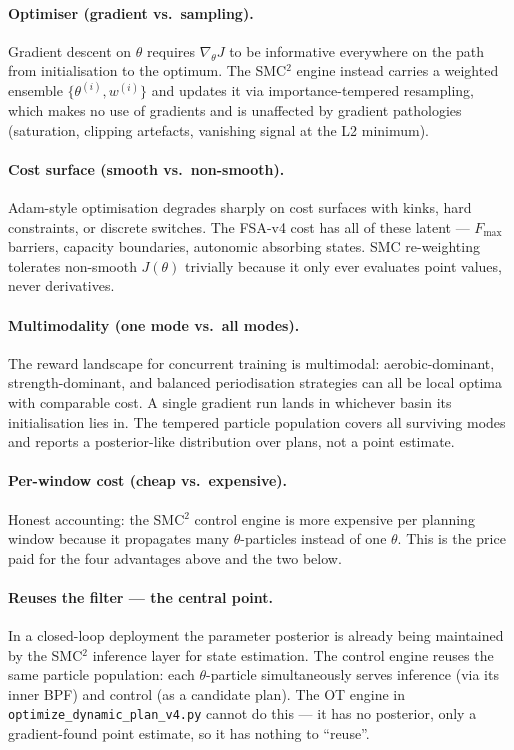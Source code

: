 \paragraph{Optimiser (gradient vs.\ sampling).} Gradient descent on $\theta$ requires $\nabla_\theta J$ to be informative everywhere on the path from initialisation to the optimum. The SMC$^2$ engine instead carries a weighted ensemble $\{\theta^{(i)}, w^{(i)}\}$ and updates it via importance-tempered resampling, which makes no use of gradients and is unaffected by gradient pathologies (saturation, clipping artefacts, vanishing signal at the L2 minimum).

\paragraph{Cost surface (smooth vs.\ non-smooth).} Adam-style optimisation degrades sharply on cost surfaces with kinks, hard constraints, or discrete switches. The FSA-v4 cost has all of these latent --- $F_{\max}$ barriers, capacity boundaries, autonomic absorbing states. SMC re-weighting tolerates non-smooth $J(\theta)$ trivially because it only ever evaluates point values, never derivatives.

\paragraph{Multimodality (one mode vs.\ all modes).} The reward landscape for concurrent training is multimodal: aerobic-dominant, strength-dominant, and balanced periodisation strategies can all be local optima with comparable cost. A single gradient run lands in whichever basin its initialisation lies in. The tempered particle population covers all surviving modes and reports a posterior-like distribution over plans, not a point estimate.

\paragraph{Per-window cost (cheap vs.\ expensive).} Honest accounting: the SMC$^2$ control engine is more expensive per planning window because it propagates many $\theta$-particles instead of one $\theta$. This is the price paid for the four advantages above and the two below.

\paragraph{Reuses the filter --- the central point.} In a closed-loop deployment the parameter posterior is already being maintained by the SMC$^2$ inference layer for state estimation. The control engine reuses the same particle population: each $\theta$-particle simultaneously serves inference (via its inner BPF) and control (as a candidate plan). The OT engine in \texttt{optimize\_dynamic\_plan\_v4.py} cannot do this --- it has no posterior, only a gradient-found point estimate, so it has nothing to ``reuse''.

